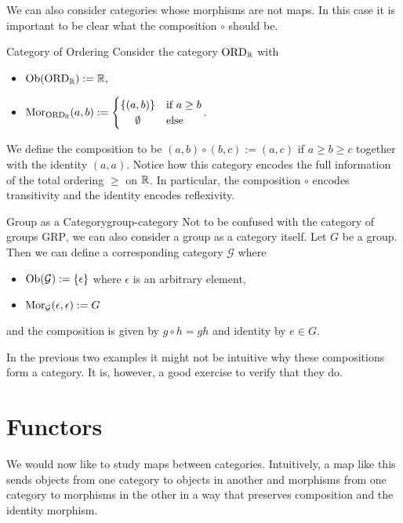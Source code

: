We can also consider categories whose morphisms are not maps. In this case it is important to be clear what the composition $\circ$ should be.

\begin{example}{Category of Ordering}{}
Consider the category $\mathrm{ORD}_\mathbb R$ with
\begin{itemize}
    \item $\mathrm {Ob}(\mathrm{ORD}_\mathbb R) := \mathbb R,$
    \item $\mor_{\mathrm{ORD}_\R}(a,b) := \begin{cases}
        \{(a,b)\} & \text{if $a \ge b$} \\
        \hfil \emptyset & \text{else}
    \end{cases}$.
\end{itemize}
We define the composition to be $(a,b) \circ (b,c) := (a,c)$ if $a \ge b \ge c$ together with the identity $(a,a)$.
Notice how this category encodes the full information of the total ordering $\ge$ on $\mathbb R$. In particular, the composition $\circ$ encodes transitivity and the identity encodes reflexivity.
\end{example}

\begin{example}{Group as a Category}{group-category}
Not to be confused with the category of groups $\mathrm{GRP}$, we can also consider a group as a category itself.
Let $G$ be a group. Then we can define a corresponding category $\mathcal{G}$ where
\begin{itemize}
    \item $\mathrm {Ob}(\mathcal{G}) := \{\epsilon\}$ where $\epsilon$ is an arbitrary element,
    \item $\mathrm {Mor}_{\mathcal{G}}(\epsilon,\epsilon) := G$
\end{itemize}
and the composition is given by $g \circ h = gh$ and identity by $e \in G$.
\end{example}
In the previous two examples it might not be intuitive why these compositions form a category. It is, however, a good exercise to verify that they do.

\section{Functors}
We would now like to study maps between categories.
%
Intuitively, a map like this sends objects from one category to objects in another and morphisms from one category to morphisms in the other in a way that preserves composition and the identity morphism.

